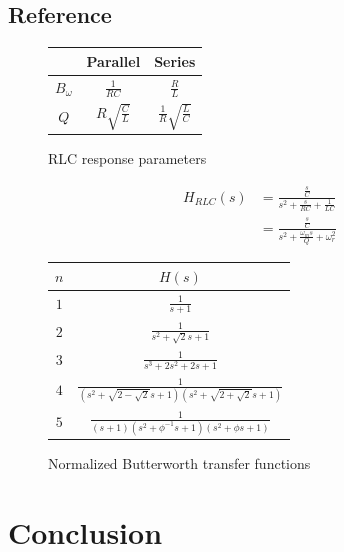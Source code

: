 \documentclass[nobib]{tufte-handout}
\begin{document}
\subsection{Reference}

\begin{figure}
    \begin{center}
        \begin{tabular}{c | c | c }
            & Parallel & Series \\
            \hline
            $B_{\omega}$ & $\frac{1}{RC}$ & $\frac{R}{L}$ \\
            $Q$ & $R\sqrt{\frac{C}{L}}$ & $\frac{1}{R}\sqrt{\frac{L}{C}}$ \\
        \end{tabular}
    \end{center}
    \caption{RLC response parameters}
    \label{tab:RLC response parameters}
\end{figure}

\begin{align}
    H_{RLC}(s) &= \frac{\frac{s}{C}}{s^2 + \frac{s}{RC} + \frac{1}{LC}} \\
    &= \frac{\frac{s}{C}}{s^2 + \frac{\omega_m s}{Q} + \omega^2_r}
\end{align}

\begin{figure}
    \begin{center}
        \begin{tabular}{c | c}
            $n$ & $H(s)$ \\
            \hline
            $1$ & $\frac{1}{s+1}$ \\
            $2$ & $\frac{1}{s^2+\sqrt{2}s + 1}$ \\
            $3$ & $\frac{1}{s^3 + 2s^2 + 2s + 1}$ \\
            $4$ & $\frac{1}{(s^{2}+\sqrt{2-\sqrt{2} } s+1)(s^{2}+\sqrt{2+\sqrt{2} } s+1)}$ \\
            $5$ & $\frac{1}{(s+1)(s^2+\phi^{-1} s+1)(s^2+\phi s+1)}$
        \end{tabular}
    \end{center}
    \caption{Normalized Butterworth transfer functions}
    \label{tab:normalized butterworth}
\end{figure}

\section{Conclusion}
\end{document}
